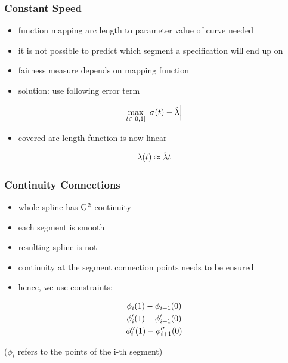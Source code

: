 \documentclass{beamer}
\begin{document}
		
		\begin{frame}
			\frametitle{Constant Speed}
			\begin{itemize}
				\item function mapping arc length to parameter value of curve needed
				\item it is not possible to predict which segment a specification will end up on
				\item fairness measure depends on mapping function
				\item solution: use following error term
			\end{itemize}
			
			\begin{equation*}
				\max_{t \in \left[ 0,1 \right]} \left| \sigma\!\left( t \right) - \hat{\lambda} \right|
			\end{equation*}
			
			\begin{itemize}
				\item covered arc length function is now linear
			\end{itemize}
			\begin{equation*}
				\lambda\!\left( t \right) \approx \hat{\lambda}t
			\end{equation*}
		\end{frame}
		
		\begin{frame}
			\frametitle{Continuity Connections}
			\begin{itemize}
				\item whole spline has \(\mathrm{G}^{2}\) continuity
				\item each segment is smooth
				\item resulting spline is not
				\item continuity at the segment connection points needs to be ensured
				\item hence, we use constraints:
			\end{itemize}
			\begin{equation*}
				\begin{gathered}
					\phi_i\!\left( 1 \right) - \phi_{i + 1}\!\left( 0 \right)\\
					\phi'_i\!\left( 1 \right) - \phi'_{i + 1}\!\left( 0 \right)\\
					\phi''_i\!\left( 1 \right) - \phi''_{i + 1}\!\left( 0 \right)
				\end{gathered}
			\end{equation*}
			
			(\(\phi_i\) refers to the points of the i-th segment)
		\end{frame}
		
\end{document}
